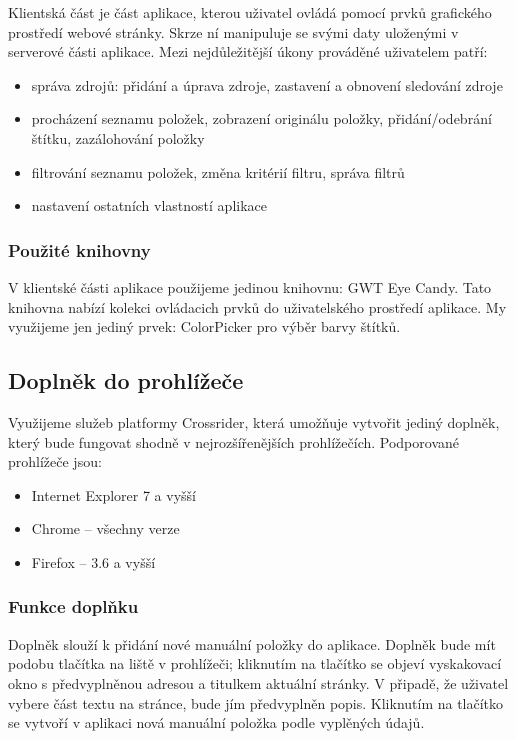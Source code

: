 Klientská část je část aplikace, kterou uživatel ovládá pomocí prvků grafického prostředí webové stránky.
Skrze ní manipuluje se svými daty uloženými v serverové části aplikace.
Mezi nejdůležitější úkony prováděné uživatelem patří:
\begin{itemize}
	\item správa zdrojů: přidání a úprava zdroje, zastavení a obnovení sledování zdroje
	\item procházení seznamu položek, zobrazení originálu položky, přidání/odebrání štítku, zazálohování položky
	\item filtrování seznamu položek, změna kritérií filtru, správa filtrů
	\item nastavení ostatních vlastností aplikace
\end{itemize}

\subsubsection{Použité knihovny}

V klientské části aplikace použijeme jedinou knihovnu: GWT Eye Candy.
Tato knihovna nabízí kolekci ovládacich prvků do uživatelského prostředí aplikace.
My využijeme jen jediný prvek: ColorPicker pro výběr barvy štítků.

\subsection{Doplněk do prohlížeče}

Využijeme služeb platformy Crossrider, která umožňuje vytvořit jediný doplněk, který bude fungovat shodně v nejrozšířenějších prohlížečích.
Podporované prohlížeče jsou:
\begin{itemize}
	\item Internet Explorer 7 a vyšší
	\item Chrome -- všechny verze
	\item Firefox -- 3.6 a vyšší
\end{itemize}

\subsubsection{Funkce doplňku}

Doplněk slouží k přidání nové manuální položky do aplikace.
Doplněk bude mít podobu tlačítka na liště v prohlížeči; kliknutím na tlačítko se objeví vyskakovací okno s předvyplněnou adresou a titulkem aktuální stránky.
V připadě, že uživatel vybere část textu na stránce, bude jím předvyplněn popis.
Kliknutím na tlačítko  se vytvoří v aplikaci nová manuální položka podle vyplěných údajů.

